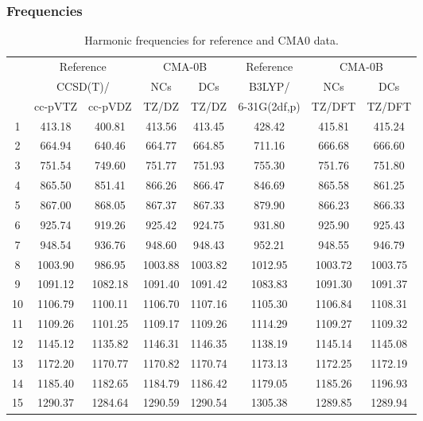 \documentclass[10pt,oneside]{article}
\begin{document}
\clearpage

\subsubsection*{Frequencies}
\begin{table}[h!]
\centering
\caption{Harmonic frequencies for reference and CMA0 data.}
\begin{tabular}{cccccccc}
\toprule
{} & \multicolumn{2}{c}{Reference} & \multicolumn{2}{c}{CMA-0B} &    Reference & \multicolumn{2}{c}{CMA-0B} \\
{} & \multicolumn{2}{c}{CCSD(T)/} &     NCs &     DCs &       B3LYP/ &     NCs &     DCs \\
{} &   cc-pVTZ & cc-pVDZ &   TZ/DZ &   TZ/DZ & 6-31G(2df,p) &  TZ/DFT &  TZ/DFT \\
\midrule
1  &    413.18 &  400.81 &  413.56 &  413.45 &       428.42 &  415.81 &  415.24 \\
2  &    664.94 &  640.46 &  664.77 &  664.85 &       711.16 &  666.68 &  666.60 \\
3  &    751.54 &  749.60 &  751.77 &  751.93 &       755.30 &  751.76 &  751.80 \\
4  &    865.50 &  851.41 &  866.26 &  866.47 &       846.69 &  865.58 &  861.25 \\
5  &    867.00 &  868.05 &  867.37 &  867.33 &       879.90 &  866.23 &  866.33 \\
6  &    925.74 &  919.26 &  925.42 &  924.75 &       931.80 &  925.90 &  925.43 \\
7  &    948.54 &  936.76 &  948.60 &  948.43 &       952.21 &  948.55 &  946.79 \\
8  &   1003.90 &  986.95 & 1003.88 & 1003.82 &      1012.95 & 1003.72 & 1003.75 \\
9  &   1091.12 & 1082.18 & 1091.40 & 1091.42 &      1083.83 & 1091.30 & 1091.37 \\
10 &   1106.79 & 1100.11 & 1106.70 & 1107.16 &      1105.30 & 1106.84 & 1108.31 \\
11 &   1109.26 & 1101.25 & 1109.17 & 1109.26 &      1114.29 & 1109.27 & 1109.32 \\
12 &   1145.12 & 1135.82 & 1146.31 & 1146.35 &      1138.19 & 1145.14 & 1145.08 \\
13 &   1172.20 & 1170.77 & 1170.82 & 1170.74 &      1173.13 & 1172.25 & 1172.19 \\
14 &   1185.40 & 1182.65 & 1184.79 & 1186.42 &      1179.05 & 1185.26 & 1196.93 \\
15 &   1290.37 & 1284.64 & 1290.59 & 1290.54 &      1305.38 & 1289.85 & 1289.94 \\

\end{tabular}
\end{table}
\end{document}
